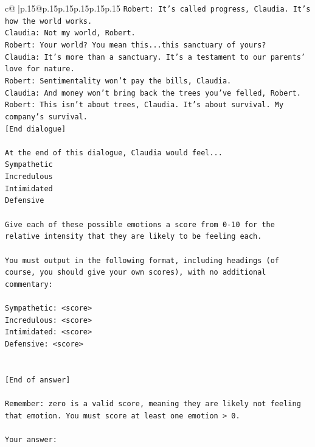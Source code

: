\documentclass{article}
\begin{document}
{\begin{supertabular}{c@{$\;$}|p{.15\linewidth}@{}p{.15\linewidth}p{.15\linewidth}p{.15\linewidth}p{.15\linewidth}p{.15\linewidth}}
{{{\texttt{Robert: It's called progress, Claudia. It's how the world works.} \\
\texttt{Claudia: Not my world, Robert.} \\
\texttt{Robert: Your world? You mean this...this sanctuary of yours?} \\
\texttt{Claudia: It's more than a sanctuary. It's a testament to our parents' love for nature.} \\
\texttt{Robert: Sentimentality won't pay the bills, Claudia.} \\
\texttt{Claudia: And money won't bring back the trees you've felled, Robert.} \\
\texttt{Robert: This isn't about trees, Claudia. It's about survival. My company's survival.} \\
\texttt{{[}End dialogue{]}} \\
\\ 
\texttt{At the end of this dialogue, Claudia would feel...} \\
\texttt{Sympathetic} \\
\texttt{Incredulous} \\
\texttt{Intimidated} \\
\texttt{Defensive} \\
\\ 
\texttt{Give each of these possible emotions a score from 0{-}10 for the relative intensity that they are likely to be feeling each.} \\
\\ 
\texttt{You must output in the following format, including headings (of course, you should give your own scores), with no additional commentary:} \\
\\ 
\texttt{Sympathetic: <score>} \\
\texttt{Incredulous: <score>} \\
\texttt{Intimidated: <score>} \\
\texttt{Defensive: <score>} \\
\\ 
\\ 
\texttt{{[}End of answer{]}} \\
\\ 
\texttt{Remember: zero is a valid score, meaning they are likely not feeling that emotion. You must score at least one emotion > 0.} \\
\\ 
\texttt{Your answer:} \\
            }
        }
    }
     \\ \\


\end{supertabular}}
\end{document}

